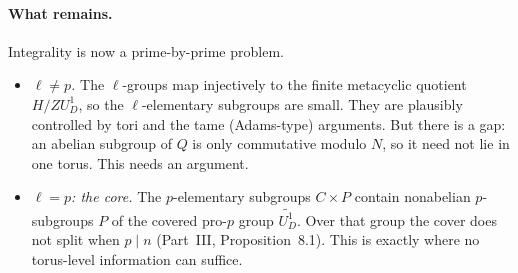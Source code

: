 \documentclass[11pt]{article}
\theoremstyle{plain}
\begin{document}
\paragraph{What remains.} Integrality is now a prime-by-prime problem.
\begin{itemize}
\item \emph{$\ell\ne p$.} The $\ell$-groups map injectively to the finite
metacyclic quotient $H/ZU_D^1$, so the $\ell$-elementary subgroups are
small. They are plausibly controlled by tori and the tame (Adams-type)
arguments. But there is a gap: an abelian subgroup of $Q$ is only
commutative modulo $N$, so it need not lie in one torus. This needs an
argument.
\item \emph{$\ell=p$: the core.} The $p$-elementary subgroups $C\times P$
contain nonabelian $p$-subgroups $P$ of the covered pro-$p$ group
$\widetilde{U_D^1}$. Over that group the cover does not split when
$p\mid n$ (Part~III, Proposition~8.1). This is exactly where no
torus-level information can suffice.
\end{itemize}
\end{document}

